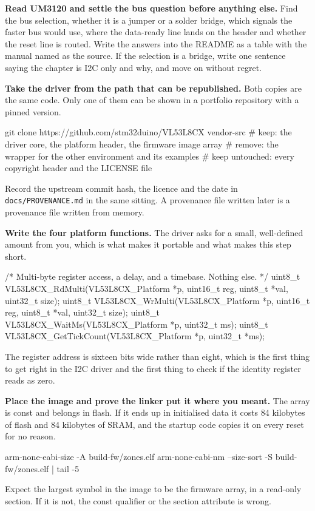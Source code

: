\begin{steps}
\item \textbf{Read UM3120 and settle the bus question before anything else.}
Find the bus selection, whether it is a jumper or a solder bridge, which signals
the faster bus would use, where the data-ready line lands on the header and
whether the reset line is routed. Write the answers into the README as a table
with the manual named as the source. If the selection is a bridge, write one
sentence saying the chapter is I2C only and why, and move on without regret.

\item \textbf{Take the driver from the path that can be republished.} Both
copies are the same code. Only one of them can be shown in a portfolio
repository with a pinned version.
\begin{shellcode}
git clone https://github.com/stm32duino/VL53L8CX vendor-src
# keep: the driver core, the platform header, the firmware image array
# remove: the wrapper for the other environment and its examples
# keep untouched: every copyright header and the LICENSE file
\end{shellcode}
Record the upstream commit hash, the licence and the date in
\texttt{docs/PROVENANCE.md} in the same sitting. A provenance file written later
is a provenance file written from memory.

\item \textbf{Write the four platform functions.} The driver asks for a small,
well-defined amount from you, which is what makes it portable and what makes
this step short.
\begin{ccode}
/* Multi-byte register access, a delay, and a timebase. Nothing else. */
uint8_t VL53L8CX_RdMulti(VL53L8CX_Platform *p, uint16_t reg,
                         uint8_t *val, uint32_t size);
uint8_t VL53L8CX_WrMulti(VL53L8CX_Platform *p, uint16_t reg,
                         uint8_t *val, uint32_t size);
uint8_t VL53L8CX_WaitMs(VL53L8CX_Platform *p, uint32_t ms);
uint8_t VL53L8CX_GetTickCount(VL53L8CX_Platform *p, uint32_t *ms);
\end{ccode}
The register address is sixteen bits wide rather than eight, which is the first
thing to get right in the I2C driver and the first thing to check if the
identity register reads as zero.

\item \textbf{Place the image and prove the linker put it where you meant.} The
array is const and belongs in flash. If it ends up in initialised data it costs
84 kilobytes of flash and 84 kilobytes of SRAM, and the startup code copies it
on every reset for no reason.
\begin{shellcode}
arm-none-eabi-size -A build-fw/zones.elf
arm-none-eabi-nm --size-sort -S build-fw/zones.elf | tail -5
\end{shellcode}
Expect the largest symbol in the image to be the firmware array, in a read-only
section. If it is not, the const qualifier or the section attribute is wrong.


\end{steps}

